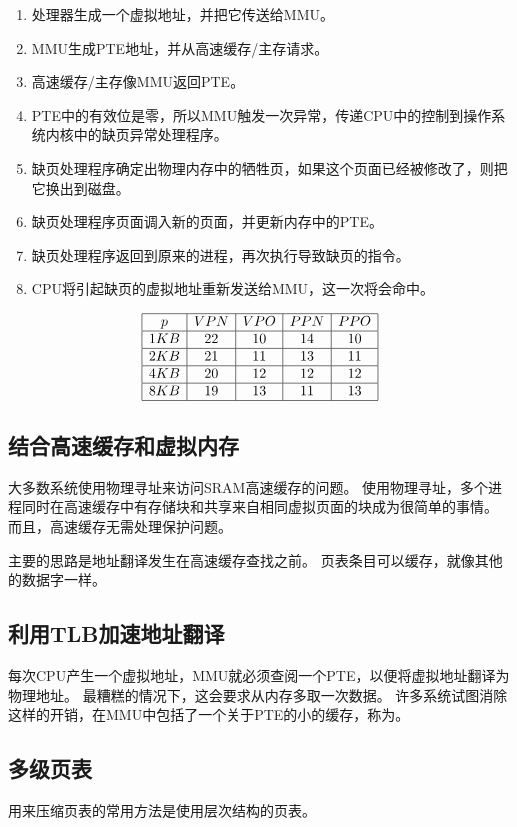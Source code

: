 {    \begin{enumerate}
        \item 处理器生成一个虚拟地址，并把它传送给MMU。
        \item MMU生成PTE地址，并从高速缓存/主存请求。
        \item 高速缓存/主存像MMU返回PTE。
        \item PTE中的有效位是零，所以MMU触发一次异常，传递CPU中的控制到操作系统内核中的缺页异常处理程序。
        \item 缺页处理程序确定出物理内存中的牺牲页，如果这个页面已经被修改了，则把它换出到磁盘。
        \item 缺页处理程序页面调入新的页面，并更新内存中的PTE。
        \item 缺页处理程序返回到原来的进程，再次执行导致缺页的指令。
        \item CPU将引起缺页的虚拟地址重新发送给MMU，这一次将会命中。
    \end{enumerate}

    \begin{practicec}
        \begin{table}
            \[
                \begin{array}{|c|c|c|c|c|}
                    \hline
                    p & VPN & VPO & PPN & PPO \\
                    \hline
                    1KB & 22 & 10 & 14 & 10 \\
                    \hline
                    2KB & 21 & 11 & 13 & 11 \\
                    \hline
                    4KB & 20 & 12 & 12 & 12 \\
                    \hline
                    8KB & 19 & 13 & 11 & 13 \\
                    \hline
                \end{array}
            \]
        \end{table}
    \end{practicec}

    \subsection{结合高速缓存和虚拟内存}
    {
        大多数系统使用物理寻址来访问SRAM高速缓存的问题。
        使用物理寻址，多个进程同时在高速缓存中有存储块和共享来自相同虚拟页面的块成为很简单的事情。
        而且，高速缓存无需处理保护问题。

        主要的思路是地址翻译发生在高速缓存查找之前。
        页表条目可以缓存，就像其他的数据字一样。
    }

    \subsection{利用TLB加速地址翻译}
    {
        每次CPU产生一个虚拟地址，MMU就必须查阅一个PTE，以便将虚拟地址翻译为物理地址。
        最糟糕的情况下，这会要求从内存多取一次数据。
        许多系统试图消除这样的开销，在MMU中包括了一个关于PTE的小的缓存，称为。
    }

    \subsection{多级页表}
    {
        用来压缩页表的常用方法是使用层次结构的页表。
    }
}
